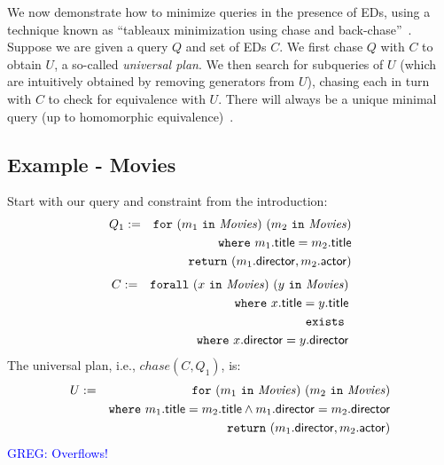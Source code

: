\documentclass[preprint]{sigplanconf}
\newcommand{\FOR}{{\tt for} \ }
\newcommand{\FORALL}{{\tt forall} \ }
\newcommand{\EXISTS}{{\tt exists} \ }
\newcommand{\WHERE}{{\tt where} \ }
\newcommand{\IN}{ \ {\tt in} \ }
\newcommand{\RETURN}{{\tt return} \ }
\newcommand{\greg}[1]{\textcolor{blue}{GREG: #1}}
\newcommand{\relation}[1]{\ensuremath{\mathit{#1}}\xspace}
\begin{document}
We now demonstrate how to minimize queries in the presence of EDs, using a technique known as ``tableaux minimization using chase and back-chase''~\cite{Deutsch:2006:QRC:1121995.1122010}.
Suppose we are given a query $Q$ and set of EDs $C$.
We first chase $Q$ with $C$ to obtain $U$, a so-called {\it universal plan}.
We then search for subqueries of $U$ (which are intuitively obtained by removing generators from $U$), chasing each in turn with $C$ to check for equivalence with $U$.
There will always be a unique minimal query (up to homomorphic equivalence)~\cite{Deutsch:2006:QRC:1121995.1122010}.

\subsection*{Example - Movies}
Start with our query and constraint from the introduction:
\begin{eqnarray*}
Q_1 & := & \FOR (m_1 \IN \relation{Movies}) \ (m_2 \IN \relation{Movies}) \\
 & & \WHERE m_1.{\sf title} = m_2.{\sf title} \\
 & & \RETURN (m_1.{\sf director}, m_2.{\sf actor})
\end{eqnarray*}
\begin{eqnarray*}
C & := & \FORALL (x \IN \relation{Movies}) \ (y \IN \relation{Movies}) \\
& & \WHERE x.{\sf title} = y.{\sf title} \\
& & \EXISTS \\
& & \WHERE x.{\sf director} = y.{\sf director}
\end{eqnarray*}
The universal plan, i.e., $chase(C,Q_1)$, is:
\begin{eqnarray*}
U & := & \FOR (m_1 \IN \relation{Movies}) \ (m_2 \IN \relation{Movies}) \\
 & & \WHERE m_1.{\sf title} = m_2.{\sf title} \wedge m_1.{\sf director} = m_2.{\sf 
director} \\
 & & \RETURN (m_1.{\sf director}, m_2.{\sf actor})
\end{eqnarray*}
\greg{Overflows!}
\end{document}
